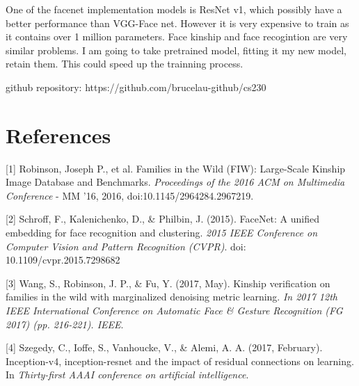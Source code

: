 \documentclass{article}
\begin{document}
One of the facenet implementation models is ResNet v1, which possibly have a
better performance than VGG-Face net. However it is very expensive to train as
it contains over 1 million parameters. Face kinship and face recogintion are
very similar problems. I am going to take pretrained model, fitting it my new
model, retain them. This could speed up the trainning process.

github repository: https://github.com/brucelau-github/cs230

\newpage
\section*{References}
\medskip
\small
[1] Robinson, Joseph P., et al. Families in the Wild (FIW): Large-Scale Kinship
Image Database and Benchmarks. {\it Proceedings of the 2016 ACM on Multimedia
Conference} - MM '16, 2016, doi:10.1145/2964284.2967219.

[2] Schroff, F., Kalenichenko, D., \& Philbin, J. (2015). FaceNet: A unified
embedding for face recognition and clustering. {\it 2015 IEEE Conference on
Computer Vision and Pattern Recognition (CVPR)}. doi: 10.1109/cvpr.2015.7298682

[3] Wang, S., Robinson, J. P., \& Fu, Y. (2017, May). Kinship verification on
families in the wild with marginalized denoising metric learning. {\it In 2017 12th
IEEE International Conference on Automatic Face \& Gesture Recognition (FG 2017)
(pp. 216-221). IEEE}.

[4] Szegedy, C., Ioffe, S., Vanhoucke, V., \& Alemi, A. A. (2017, February).
Inception-v4, inception-resnet and the impact of residual connections on
learning. In {\it Thirty-first AAAI conference on artificial intelligence}.
\end{document}
